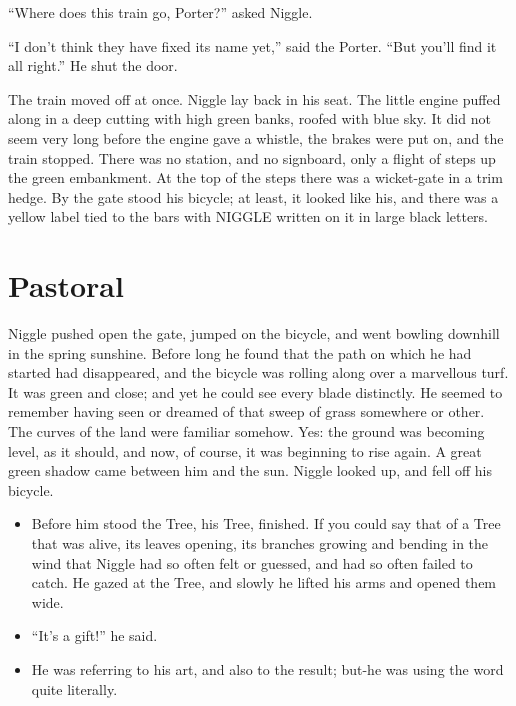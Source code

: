\documentclass[english]{scrartcl}
\begin{document}
“Where does this train go, Porter?” asked Niggle.

“I don’t think they have fixed its name yet,” said the Porter. “But you’ll find it all right.” He shut the door.

The train moved off at once. Niggle lay back in his seat. The little engine puffed along in a deep cutting with high green banks, roofed with blue sky. It did not seem very long before the engine gave a whistle, the brakes were put on, and the train stopped. There was no station, and no signboard, only a flight of steps up the green embankment. At the top of the steps there was a wicket-gate in a trim hedge. By the gate stood his bicycle; at least, it looked like his, and there was a yellow label tied to the bars with NIGGLE written on it in large black letters.

\section*{Pastoral}

Niggle pushed open the gate, jumped on the bicycle, and went bowling downhill in the spring sunshine. Before long he found that the path on which he had started had disappeared, and the bicycle was rolling along over a marvellous turf. It was green and close; and yet he could see every blade distinctly. He seemed to remember having seen or dreamed of that sweep of grass somewhere or other. The curves of the land were familiar somehow. Yes: the ground was becoming level, as it should, and now, of course, it was beginning to rise again. A great green shadow came between him and the sun. Niggle looked up, and fell off his bicycle.

\begin{itemize}
\item Before him stood the Tree, his Tree, finished. If you could say that of a Tree that was alive, its leaves opening, its branches growing and bending in the wind that Niggle had so often felt or guessed, and had so often failed to catch. He gazed at the Tree, and slowly he lifted his arms and opened them wide.
\end{itemize}

\begin{itemize}
\item “It’s a gift!” he said.
\item He was referring to his art, and also to the result; but-he was using the word quite literally.
\end{itemize}
\end{document}
